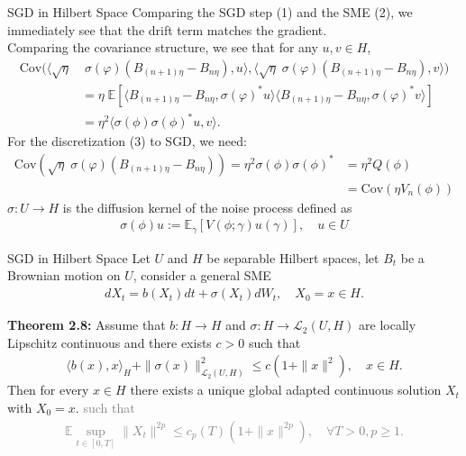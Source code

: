 \documentclass[dvipsnames, handout]{beamer}
\newcommand{\1}{\mathds{1}}	%
\begin{document}
\begin{frame}{SGD in Hilbert Space}
    Comparing the SGD step (1) and the SME (2), we immediately see that the drift term matches the gradient.\\
    Comparing the covariance structure, we see that for any $u, v \in H$,
    \begin{align*}
        \text{Cov}(\langle \sqrt{\eta} &\; \sigma(\varphi)( B_{(n+1)\eta} - B_{n \eta}), u \rangle, \langle \sqrt{\eta} \; \sigma(\varphi)( B_{(n+1)\eta} - B_{n \eta}), v \rangle)\\
        &= \eta \; \mathbb{E} \left[\langle B_{(n+1)\eta} - B_{n \eta}, \sigma(\varphi)^*u \rangle \langle B_{(n+1)\eta} - B_{n \eta}, \sigma(\varphi)^*v \rangle\right]\\
        &= \eta^2 \langle \sigma(\phi) \sigma(\phi)^*u, v \rangle.
    \end{align*}
    For the discretization (3) to SGD, we need:
    \begin{align*}
        \text{Cov}( \sqrt{\eta} \; \sigma(\varphi)( B_{(n+1)\eta} - B_{n \eta})) = \eta^2 \sigma(\phi) \sigma(\phi)^* &= \eta^2 Q(\phi)\\
        &= \text{Cov}(\eta V_n (\phi))
    \end{align*}
    $\sigma: U \rightarrow H$ is the diffusion kernel of the noise process defined as
    \begin{align*}
        \sigma(\phi)u := \mathbb{E}_{\gamma}[V(\phi; \gamma) u(\gamma)], \quad u \in U
    \end{align*}
\end{frame}


\begin{frame}{SGD in Hilbert Space}
    Let $U$ and $H$ be separable Hilbert spaces, let $B_t$ be a Brownian motion on $U$, consider a general SME
    \begin{align*}
        dX_t = b(X_t)dt + \sigma(X_t) dW_t, \quad X_0 = x \in H.
    \end{align*}
    
    \textbf{Theorem 2.8: } Assume that $b: H \rightarrow H$ and $\sigma: H \rightarrow \mathcal{L}_2(U, H)$ are locally Lipschitz continuous and there exists $c > 0$ such that
    \begin{align*}
        \langle b(x), x \rangle_H + \| \sigma(x)\|^2_{\mathcal{L}_2(U,H)} \leq c(1 + \|x\|^2), \quad x \in H.
    \end{align*}
    Then for every $x \in H$ there exists a unique global adapted continuous solution $X_t$ with $X_0 = x$. \textcolor{gray}{such that
    \begin{align*}
        \mathbb{E} \sup_{t \in [0, T]} \|X_t\|^{2p} \leq c_p (T) (1 + \|x\|^{2p}), \quad \forall T > 0, p\geq 1.
    \end{align*}}
\end{frame}
\end{document}
